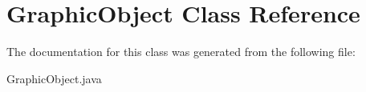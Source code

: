 \hypertarget{classGraphicObject}{\section{Graphic\-Object Class Reference}
\label{classGraphicObject}
}


The documentation for this class was generated from the following file\-:\begin{DoxyCompactItemize}
\item 
Graphic\-Object.\-java\end{DoxyCompactItemize}
